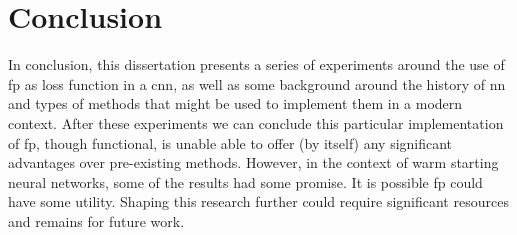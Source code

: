\chapter{Conclusion}

In conclusion, this dissertation presents a series of experiments around the use of \gls{fp} as loss function in a \gls{cnn}, as well as some background around the history of \gls{nn} and types of methods that might be used to implement them in a modern context. After these experiments we can conclude this particular implementation of \gls{fp}, though functional, is unable able to offer (by itself) any significant advantages over pre-existing methods. However, in the context of warm starting neural networks, some of the results had some promise. It is possible \gls{fp} could have some utility. Shaping this research further could require significant resources and remains for future work.